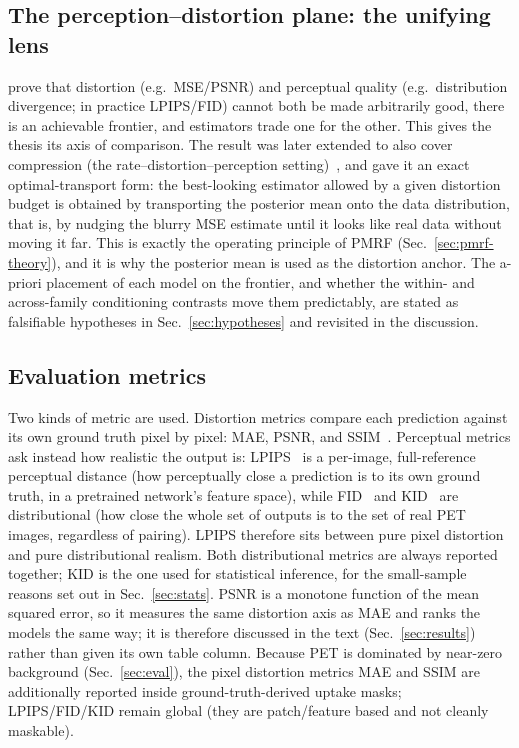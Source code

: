 \documentclass[11pt,a4paper]{article}
\begin{document}
\subsection{The perception--distortion plane: the unifying lens}
\label{sec:pd-plane}
\textcite{blau2018perception} prove that distortion (e.g.\ MSE/PSNR) and perceptual
quality (e.g.\ distribution divergence; in practice LPIPS/FID) cannot both be made
arbitrarily good, there is an achievable frontier, and estimators trade one for the
other. This gives the thesis its axis of comparison. The result was later extended to also cover
compression (the rate--distortion--perception setting)~\parencite{blaumichaeli2019rethinking}, and
\textcite{freirich2021theory} gave it an exact optimal-transport form: the best-looking estimator
allowed by a given distortion budget is obtained by transporting the posterior mean onto the
data distribution, that is, by nudging the blurry MSE estimate until it looks like real data
without moving it far. This is exactly the operating principle of PMRF
(Sec.~\ref{sec:pmrf-theory}), and it is why the posterior mean is used as the distortion anchor. The a-priori placement of each model on the frontier, and whether the
within- and across-family conditioning contrasts move them predictably, are stated as
falsifiable hypotheses in Sec.~\ref{sec:hypotheses} and revisited in the discussion.

\subsection{Evaluation metrics}
\label{sec:metrics-theory}
Two kinds of metric are used. Distortion metrics compare each prediction against its own ground
truth pixel by pixel: MAE, PSNR, and SSIM~\parencite{wang2004ssim}. Perceptual metrics ask instead
how realistic the output is: LPIPS~\parencite{zhang2018lpips} is a per-image, full-reference
perceptual distance (how perceptually close a prediction is to its own ground truth, in a
pretrained network's feature space), while FID~\parencite{heusel2017fid} and
KID~\parencite{binkowski2018kid} are distributional (how close the whole set of outputs is to the
set of real PET images, regardless of pairing). LPIPS therefore sits between pure pixel distortion
and pure distributional realism. Both distributional metrics are always reported together; KID is
the one used for statistical inference, for the small-sample reasons set out in
Sec.~\ref{sec:stats}. PSNR is a monotone function of the mean squared error, so it measures the
same distortion axis as MAE and ranks the models the same way; it is therefore discussed in the
text (Sec.~\ref{sec:results}) rather than given its own table column. Because PET is dominated by
near-zero background (Sec.~\ref{sec:eval}), the pixel distortion metrics MAE and SSIM are
additionally reported inside ground-truth-derived uptake masks; LPIPS/FID/KID remain global (they
are patch/feature based and not cleanly maskable).
\end{document}
